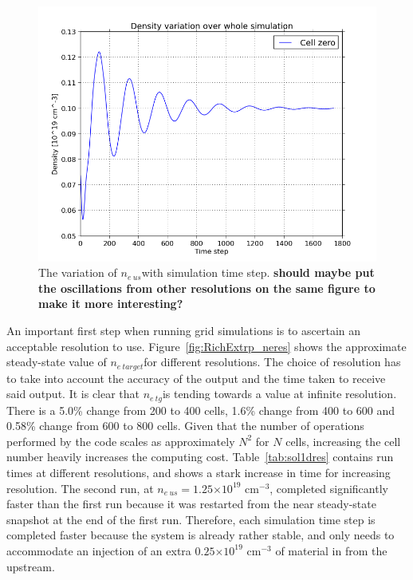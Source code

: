\documentclass[11pt, twocolumn]{article}  %
\providecommand{\e}[1]{\ensuremath{\times 10^{#1}}} %
\providecommand{\neus}{$n_{e~us}$} %
\providecommand{\netarget}{$n_{e~target}$} %
\providecommand{\netg}{$n_{e~tg}$} %
\begin{document}
\begin{figure}
\includegraphics[scale=0.4]{Figures/sol1d/ne_var_ny=800.PNG}
\centering
\caption{The variation of \neus with simulation time step. \textbf{should maybe put the oscillations from other resolutions on the same figure to make it more interesting?}}\label{fig:ne_var_ny=800}
\end{figure}

An important first step when running grid simulations is to ascertain an acceptable resolution to use. Figure~\ref{fig:RichExtrp_neres} shows the approximate steady-state value of \netarget for different resolutions. The choice of resolution has to take into account the accuracy of the output and the time taken to receive said output. It is clear that \netg is tending towards a value at infinite resolution. There is a 5.0\% change from 200 to 400 cells, 1.6\% change from 400 to 600 and 0.58\% change from 600 to 800 cells. Given that the number of operations performed by the code scales as approximately $N^2$ for $N$ cells, increasing the cell number heavily increases the computing cost. Table~\ref{tab:sol1dres} contains run times at different resolutions, and shows a stark increase in time for increasing resolution. The second run, at \neus $= 1.25\e{19}$ cm$^{-3}$, completed significantly faster than the first run because it was restarted from the near steady-state snapshot at the end of the first run. Therefore, each simulation time step is completed faster because the system is already rather stable, and only needs to accommodate an injection of an extra $0.25\e{19}$ cm$^{-3}$ of material in from the upstream.
\end{document}
